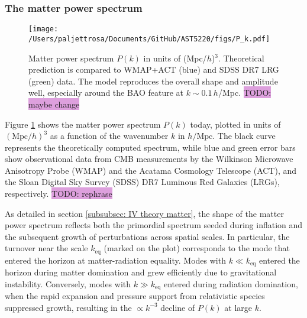 \documentclass{aa}
\numberwithin{equation}{section}
\numberwithin{table}{section}
\numberwithin{figure}{section}
\begin{document}



\subsubsection{The matter power spectrum}

\begin{figure}
  \centering
  \texttt{[image: /Users/paljettrosa/Documents/GitHub/AST5220/figs/P\_k.pdf]}
  \caption{Matter power spectrum $P(k)$ in units of (Mpc/$h$)$^3$. Theoretical prediction is compared to WMAP+ACT (blue) and SDSS DR7 LRG (green) data. The model reproduces the overall shape and amplitude well, especially around the BAO feature at $k \sim 0.1\,h$/Mpc. \colorbox{Plum}{TODO: maybe change}}\label{fig:P_k}
\end{figure}

Figure \ref{fig:P_k} shows the matter power spectrum $P(k)$ today, plotted in units of $(\text{Mpc}/h)^3$ as a function of the wavenumber $k$ in $h/\text{Mpc}$. The black curve represents the theoretically computed spectrum, while blue and green error bars show observational data from CMB measurements by the Wilkinson Microwave Anisotropy Probe (WMAP) and the Acatama Cosmology Telescope (ACT), and the Sloan Digital Sky Survey (SDSS) DR7 Luminous Red Galaxies (LRGs), respectively. \colorbox{Plum}{TODO: rephrase}

As detailed in section \ref{subsubsec: IV theory matter}, the shape of the matter power spectrum reflects both the primordial spectrum seeded during inflation and the subsequent growth of perturbations across spatial scales. In particular, the turnover near the scale $k_\text{eq}$ (marked on the plot) corresponds to the mode that entered the horizon at matter-radiation equality. Modes with $k \ll k_\text{eq}$ entered the horizon during matter domination and grew efficiently due to gravitational instability. Conversely, modes with $k \gg k_\text{eq}$ entered during radiation domination, when the rapid expansion and pressure support from relativistic species suppressed growth, resulting in the $\propto k^{-3}$ decline of $P(k)$ at large $k$. 
\end{document}
